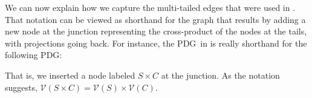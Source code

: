\documentclass{article}
\newcommand{\V}{\mathcal V}
\newcommand{\MN}{PDG}
\numberwithin{equation}{section}
\begin{document}
	We can now explain how we capture the multi-tailed edges that were used in 
	.
%
That notation can be viewed as shorthand for the graph that results by
        adding a new
node at the junction representing the cross-product of the 
nodes at the tails, with projections going back.  For
instance,  the \MN\ in 
is really shorthand for the following PDG:
	\begin{center}
	\end{center}
That is, we inserted a node labeled $S \times C$ at the junction.  As
the notation suggests, $\V( S \times C) = \V(S) \times \V(C)$.
\end{document}
